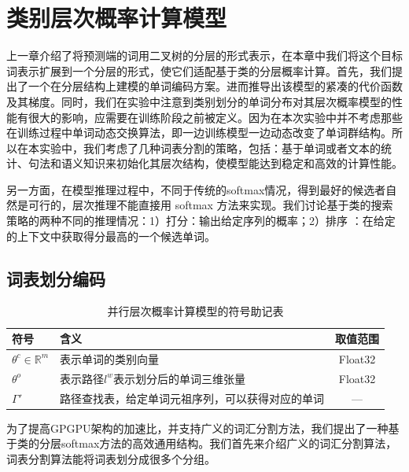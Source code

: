 \chapter{类别层次概率计算模型}
上一章介绍了将预测端的词用二叉树的分层的形式表示，在本章中我们将这个目标词表示扩展到一个分层的形式，使它们适配基于类的分层概率计算。首先，我们提出了一个在分层结构上建模的单词编码方案。进而推导出该模型的紧凑的代价函数及其梯度。同时，我们在实验中注意到类别划分的单词分布对其层次概率模型的性能有很大的影响，应需要在训练阶段之前被定义。因为在本次实验中并不考虑那些在训练过程中单词动态交换算法，即一边训练模型一边动态改变了单词群结构。所以在本实验中，我们考虑了几种词表分割的策略，包括：基于单词或者文本的统计、句法和语义知识来初始化其层次结构，使模型能达到稳定和高效的计算性能。

另一方面，在模型推理过程中，不同于传统的softmax情况，得到最好的候选者自然是可行的，层次推理不能直接用 softmax 方法来实现。我们讨论基于类的搜索策略的两种不同的推理情况：1）打分：输出给定序列的概率；2）排序   ：在给定的上下文中获取得分最高的一个候选单词。


\section{词表划分编码}
\begin{table}[!ht]
  \centering
  \caption{并行层次概率计算模型的符号助记表}
\begin{tabular}{llc}
  \toprule
   符号&含义&取值范围\\ \midrule
$\theta^c\in\mathbb{R}^m$ &表示单词的类别向量& Float32\\
$ \theta^o$ &表示路径$l^w$表示划分后的单词三维张量&Float32 \\
$\Gamma'$ &路径查找表，给定单词元祖序列，可以获得对应的单词&--- \\
  \bottomrule
\end{tabular}
\end{table}
为了提高GPGPU架构的加速比，并支持广义的词汇分割方法，我们提出了一种基于类的分层softmax方法的高效通用结构。我们首先来介绍广义的词汇分割算法，词表分割算法能将词表划分成很多个分组。


